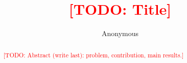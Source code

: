 \documentclass[sigconf]{acmart}
\newcommand{\todo}[1]{\textcolor{red}{[TODO: #1]}}
\begin{document}
\title{\todo{Title}}

\author{Anonymous}

\begin{abstract}
\todo{Abstract (write last): problem, contribution, main results.}
\end{abstract}

\keywords{\todo{keywords}}

\maketitle










\end{document}
